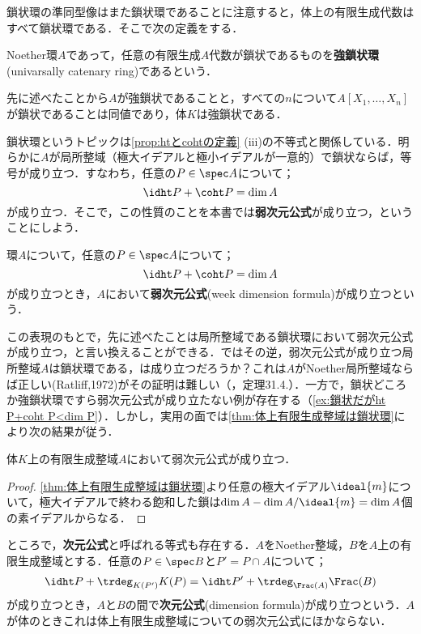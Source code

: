 鎖状環の準同型像はまた鎖状環であることに注意すると，体上の有限生成代数はすべて鎖状環である．そこで次の定義をする．

\begin{defi}[強鎖状環]
	Noether環$A$であって，任意の有限生成$A$代数が鎖状であるものを\textbf{強鎖状環}(univarsally catenary ring)であるという．
\end{defi}

先に述べたことから$A$が強鎖状であることと，すべての$n$について$A[X_1,\dots,X_n]$が鎖状であることは同値であり，体$K$は強鎖状である．

鎖状環というトピックは\ref{prop:htとcohtの定義} (iii)の不等式と関係している．明らかに$A$が局所整域（極大イデアルと極小イデアルが一意的）で鎖状ならば，等号が成り立つ．すなわち，任意の$P\in\spec A$について；
\[\idht P +\coht P =\dim A\]
が成り立つ．そこで，この性質のことを本書では\textbf{弱次元公式}が成り立つ，ということにしよう．

\begin{defi}[弱次元公式]\label{defi:弱次元公式}
	環$A$について，任意の$P\in\spec A$について；
	\[\idht P+\coht P=\dim A\]
	が成り立つとき，$A$において\textbf{弱次元公式}(week dimension formula)が成り立つという．
\end{defi}

この表現のもとで，先に述べたことは局所整域である鎖状環において弱次元公式が成り立つ，と言い換えることができる．ではその逆，弱次元公式が成り立つ局所整域$A$は鎖状環である，は成り立つだろうか？これは$A$がNoether局所整域ならば正しい(Ratliff,1972)がその証明は難しい（\cite{matsu}，定理31.4.）．一方で，鎖状どころか強鎖状環ですら弱次元公式が成り立たない例が存在する（\ref{ex:鎖状だがht P+coht P<dim P}）．しかし，実用の面では\ref{thm:体上有限生成整域は鎖状環}により次の結果が従う．

\begin{prop}\label{prop:DIM}
	体$K$上の有限生成整域$A$において弱次元公式が成り立つ．
\end{prop}

\begin{proof}
	\ref{thm:体上有限生成整域は鎖状環}より任意の極大イデアル$\ideal{m}$について，極大イデアルで終わる飽和した鎖は$\dim A-\dim A/\ideal{m}=\dim A$個の素イデアルからなる．
\end{proof}

ところで，\textbf{次元公式}と呼ばれる等式も存在する．$A$をNoether整域，$B$を$A$上の有限生成整域とする．任意の$P\in\spec B$と$P'=P\cap A$について；
\[\idht P+\trdeg_{K(P')} K(P)=\idht P'+\trdeg_{\Frac(A)} \Frac(B)\]
が成り立つとき，$A$と$B$の間で\textbf{次元公式}(dimension formula)が成り立つという．$A$が体のときこれは体上有限生成整域についての弱次元公式にほかならない．

